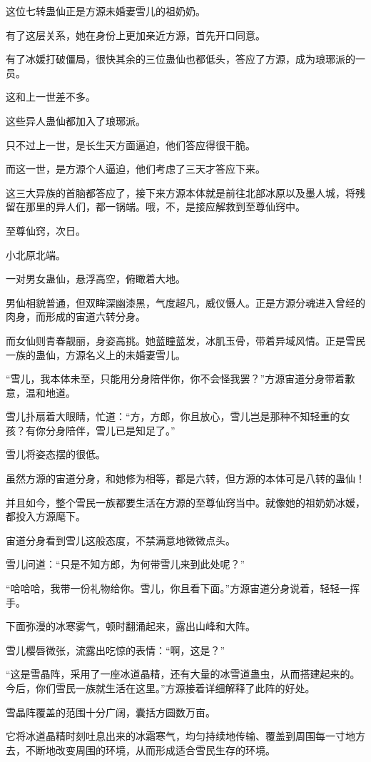\begin{this_body}
这位七转蛊仙正是方源未婚妻雪儿的祖奶奶。

有了这层关系，她在身份上更加亲近方源，首先开口同意。

有了冰媛打破僵局，很快其余的三位蛊仙也都低头，答应了方源，成为琅琊派的一员。

这和上一世差不多。

这些异人蛊仙都加入了琅琊派。

只不过上一世，是长生天方面逼迫，他们答应得很干脆。

而这一世，是方源个人逼迫，他们考虑了三天才答应下来。

这三大异族的首脑都答应了，接下来方源本体就是前往北部冰原以及墨人城，将残留在那里的异人们，都一锅端。哦，不，是接应解救到至尊仙窍中。

至尊仙窍，次日。

小北原北端。

一对男女蛊仙，悬浮高空，俯瞰着大地。

男仙相貌普通，但双眸深幽漆黑，气度超凡，威仪慑人。正是方源分魂进入曾经的肉身，而形成的宙道六转分身。

而女仙则青春靓丽，身姿高挑。她蓝瞳蓝发，冰肌玉骨，带着异域风情。正是雪民一族的蛊仙，方源名义上的未婚妻雪儿。

“雪儿，我本体未至，只能用分身陪伴你，你不会怪我罢？”方源宙道分身带着歉意，温和地道。

雪儿扑扇着大眼睛，忙道：“方，方郎，你且放心，雪儿岂是那种不知轻重的女孩？有你分身陪伴，雪儿已是知足了。”

雪儿将姿态摆的很低。

虽然方源的宙道分身，和她修为相等，都是六转，但方源的本体可是八转的蛊仙！

并且如今，整个雪民一族都要生活在方源的至尊仙窍当中。就像她的祖奶奶冰媛，都投入方源麾下。

宙道分身看到雪儿这般态度，不禁满意地微微点头。

雪儿问道：“只是不知方郎，为何带雪儿来到此处呢？”

“哈哈哈，我带一份礼物给你。雪儿，你且看下面。”方源宙道分身说着，轻轻一挥手。

下面弥漫的冰寒雾气，顿时翻涌起来，露出山峰和大阵。

雪儿樱唇微张，流露出吃惊的表情：“啊，这是？”

“这是雪晶阵，采用了一座冰道晶精，还有大量的冰雪道蛊虫，从而搭建起来的。今后，你们雪民一族就生活在这里。”方源接着详细解释了此阵的好处。

雪晶阵覆盖的范围十分广阔，囊括方圆数万亩。

它将冰道晶精时刻吐息出来的冰霜寒气，均匀持续地传输、覆盖到周围每一寸地方去，不断地改变周围的环境，从而形成适合雪民生存的环境。


\end{this_body}
